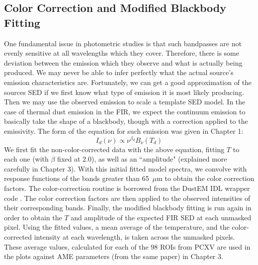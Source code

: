 \subsection{Color Correction and Modified Blackbody Fitting}
     One fundamental issue in photometric studies is that such bandpasses are not evenly sensitive at all wavelengths which they cover. Therefore, there is some deviation between the emission which they observe and what is actually being produced. We may never be able to infer perfectly what the actual source's emission characteristics are. Fortunately, we can get a good approximation of the sources SED if we first know what type of emission it is most likely producing. Then we may use the observed emission to scale a template SED model. In the case of thermal dust emission in the FIR, we expect the continuum emission to basically take the shape of a blackbody, though with a correction applied to the emissivity. The form of the equation for such emission was given in Chapter 1:
\begin{equation*}
\tag{1.3.3}
I_d(\nu) \propto \nu{}^{\beta{}_d}B_\nu{}(T_d)
\end{equation*}
     We first fit the non-color-corrected data with the above equation, fitting $T$ to each one (with $\beta$ fixed at 2.0), as well as an ``amplitude" (explained more carefully in Chapter 3). With this initial fitted model spectra, we convolve with response functions of the bands greater than 65~$\mu$m to obtain the color correction factors. The color-correction routine is borrowed from the DustEM IDL wrapper code \citep{dustem11,dustem13}.
     The color correction factors are then applied to the observed intensities of their corresponding bands. Finally, the modified blackbody fitting is run again in order to obtain the $T$ and amplitude of the expected FIR SED at each unmasked pixel.
     Using the fitted values, a mean average of the temperature, and the color-corrected intensity at each wavelength, is taken across the unmasked pixels. These average values, calculated for each of the 98 ROIs from PCXV are used in the plots against AME parameters (from the same paper) in Chapter 3.
